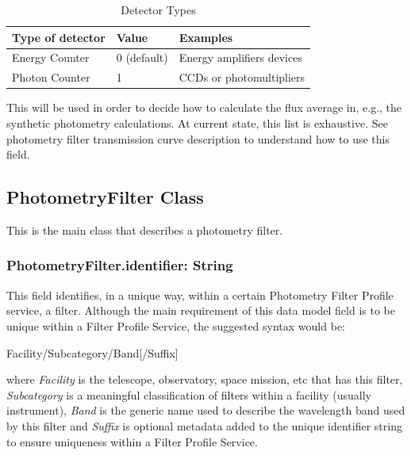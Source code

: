 \documentclass[11pt,a4paper]{ivoa}
\begin{document}
\begin{table}[ht]
 			\centering
\begin{tabular}{p{2.42in}p{0.8in}p{1.55in}}
\hline
\multicolumn{1}{|p{2.42in}}{Type of detector} &
\multicolumn{1}{|p{0.8in}}{Value} &
\multicolumn{1}{|p{1.55in}|}{Examples} \\
\hline
\multicolumn{1}{|p{2.42in}}{Energy Counter} &
\multicolumn{1}{|p{0.8in}}{0 (default)} &
\multicolumn{1}{|p{1.55in}|}{Energy amplifiers devices} \\
\hline
\multicolumn{1}{|p{2.42in}}{Photon Counter} &
\multicolumn{1}{|p{0.8in}}{1} &
\multicolumn{1}{|p{1.55in}|}{CCDs or photomultipliers} \\
\hline
\end{tabular}
\caption{Detector Types}
 \end{table}



This will be used in order to decide how to calculate the 
flux average in, e.g., the synthetic photometry calculations. 
At current state, this list is exhaustive. See photometry filter 
transmission curve description to understand how to use this field.
\par

\subsection{PhotometryFilter Class}
This is the main class that describes a photometry filter.
\par

\subsubsection{PhotometryFilter.identifier: String}
This field identifies, in a unique way, within a certain Photometry 
Filter Profile service, a filter. Although the main requirement of 
this data model field is to be unique within a Filter Profile Service, 
the suggested syntax would be:
\par


Facility/Subcategory/Band[/Suffix]
\bigskip


where \textit{Facility} is the telescope, observatory, space mission, 
etc that has this filter, \textit{Subcategory} is a meaningful 
classification of filters within a facility (usually instrument), 
\textit{Band} is the generic name used to describe the wavelength 
band used by this filter and \textit{Suffix} is optional metadata added 
to the unique identifier string to ensure uniqueness within a Filter 
Profile Service.
\par
\end{document}

